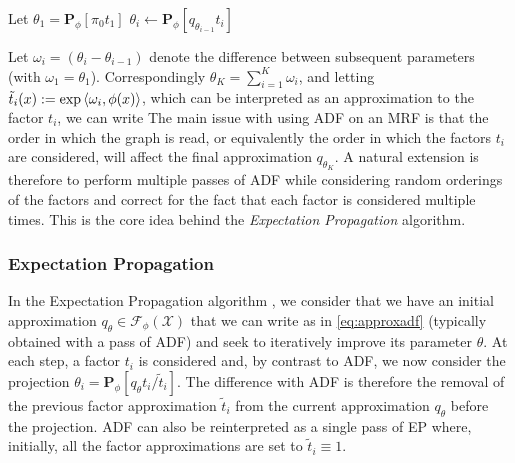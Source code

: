 \begin{algorithm}[!h]\small
	\caption{\label{alg:adf}}
	\begin{algorithmic}[1]
	\State Let $\theta_{1}=\mathbf P_{\phi}[\pi_{0}t_{1}]$
		\State $\theta_{i}\leftarrow\mathbf P_{\phi}[q_{\theta_{i-1}}t_{i}]$ 
	\EndFor\\
	\end{algorithmic}
\end{algorithm} 

Let $\omega_{i}=(\theta_{i}-\theta_{i-1})$ denote the difference between subsequent parameters (with $\omega_{1}=\theta_{1}$). Correspondingly $\theta_{K}=\sum_{i=1}^{K}\omega_{i}$, and letting $\tilde t_{i}(x):=\exp\left\langle \omega_{i},\phi(x) \right\rangle$, which can be interpreted as an approximation to the factor $t_{i}$, we can write 
%
% 
The main issue with using ADF on an MRF is that the order in which the graph is read, or equivalently the order in which the factors $t_{i}$ are considered, will affect the final approximation $q_{\theta_{K}}$. A natural extension is therefore to perform multiple passes of ADF while considering random orderings of the factors and correct for the fact that each factor is considered multiple times. This is the core idea behind the \emph{Expectation Propagation} algorithm.
%
\subsubsection*{Expectation Propagation}
%
In the Expectation Propagation algorithm \citep{minka01, minka01b, seeger07, gelman14}, we consider that we have an initial approximation $q_{\theta}\in\mathcal F_{\phi}(\mathcal X)$ that we can write as in \eqref{eq:approxadf} (typically obtained with a pass of ADF) and seek to iteratively improve its parameter $\theta$. At each step, a factor $t_{i}$ is considered and, by contrast to ADF, we now consider the projection $\theta_{i}=\mathbf P_{\phi}[q_{\theta}t_{i}/\tilde t_{i}]$. The difference with ADF is therefore the removal of the previous factor approximation $\tilde t_{i}$ from the current approximation $q_{\theta}$ before the projection. ADF can also be reinterpreted as a single pass of EP where, initially, all the factor approximations are set to $\tilde t_{i}\equiv 1$.

